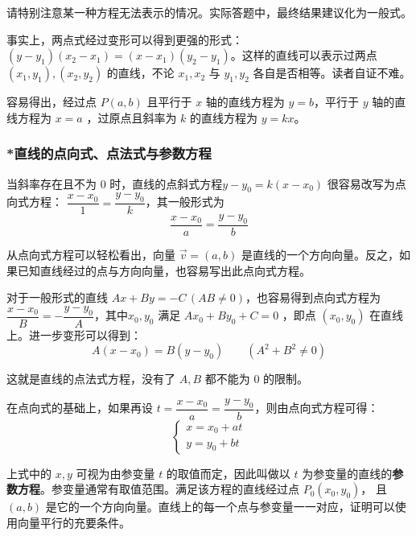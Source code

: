 \documentclass[a4paper,openany]{ctexbook}
\renewcommand{\vec}{\overrightarrow}
\begin{document}
请特别注意某一种方程无法表示的情况。实际答题中，最终结果建议化为一般式。

事实上，两点式经过变形可以得到更强的形式： \((y - y_1)(x_2 - x_1) =(x - x_1)(y_2 - y_1)\)。这样的直线可以表示过两点 \((x_1,y_1),(x_2,y_2)\) 的直线，不论 \(x_1,x_2\) 与 \(y_1,y_2\) 各自是否相等。读者自证不难。

容易得出，经过点 \(P(a,b)\) 且平行于 \(x\) 轴的直线方程为 \(y = b\)，平行于 \(y\) 轴的直线方程为 \(x = a\) ，过原点且斜率为 \(k\) 的直线方程为 \(y = kx\)。

\subsubsection{*直线的点向式、点法式与参数方程}

当斜率存在且不为 \(0\) 时，直线的点斜式方程\(y - y_0 = k(x - x_0)\) 很容易改写为点向式方程： \(\dfrac{x - x_0}{1} = \dfrac{y - y_0}{k}\)，其一般形式为 \[\dfrac{x - x_0}{a} = \dfrac{y - y_0}{b}\]

从点向式方程可以轻松看出，向量 \(\vec{v} =(a,b)\) 是直线的一个方向向量。反之，如果已知直线经过的点与方向向量，也容易写出此点向式方程。

对于一般形式的直线 \(Ax + By =- C\, (AB \neq 0)\)，也容易得到点向式方程为 \(\dfrac{x- x_0}{B} = -\dfrac{y - y_0}{A} \)，其中\(x_0,y_0\) 满足 \(Ax_0 + By_0 + C= 0\) ，即点 \((x_0,y_0)\) 在直线上。进一步变形可以得到：
\[A(x - x_0) = B(y - y_0)\qquad (A^2 + B^2 \neq 0)\]

这就是直线的点法式方程，没有了 \(A,B\) 都不能为 \(0\) 的限制。

在点向式的基础上，如果再设 \(t = \dfrac{x - x_0}{a} = \dfrac{y - y_0}{b} \)，则由点向式方程可得：
\[\begin{cases}
        x=x_0+at \\
        y=y_0+bt
    \end{cases}\]

上式中的 \(x,y\) 可视为由参变量 \(t\) 的取值而定，因此叫做以 \(t\) 为参变量的直线的\textbf{参数方程}。参变量通常有取值范围。满足该方程的直线经过点 \(P_0(x_0,y_0)\)，
且\((a,b)\) 是它的一个方向向量。直线上的每一个点与参变量一一对应，证明可以使用向量平行的充要条件。
\end{document}
